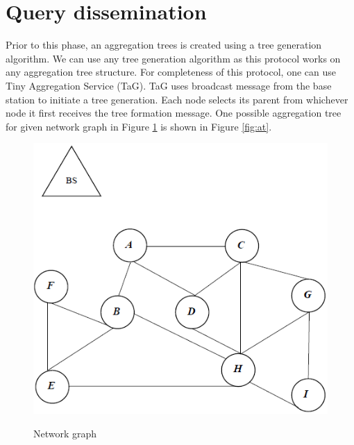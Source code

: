 	\section{Query dissemination}
		Prior to this phase, an aggregation trees is created using a tree generation algorithm.
		We can use any tree generation algorithm as this protocol works on any aggregation tree structure.
		For completeness of this protocol, one can use Tiny Aggregation Service (TaG)\cite{madden2002tag}.
		TaG uses broadcast message from the base station to initiate a tree generation.
		Each node selects its parent from whichever node it first receives the tree formation message.
		One possible aggregation tree for given network graph in Figure \ref{fig:ng} is shown in Figure \ref{fig:at}. 
		\begin{figure}[h!]
			\centering
			\includegraphics[scale = 1]{images/network-graph.png}\\
			\caption{Network graph}
			\label{fig:ng}
		\end{figure}
		
